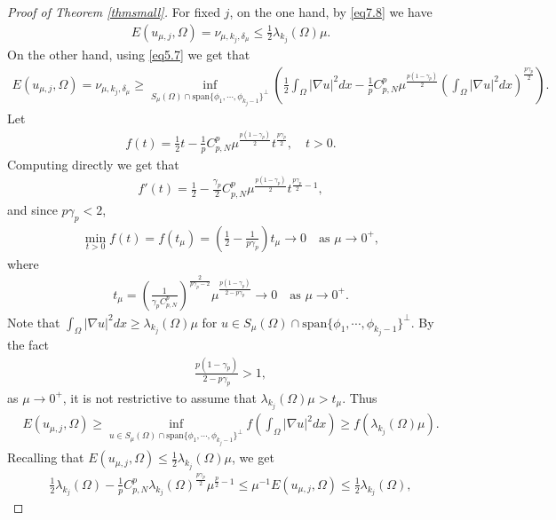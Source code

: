 \documentclass[10pt,a4paper]{article}
\theoremstyle{definition} \theoremstyle{remark}
\numberwithin{equation}{section}
\newcommand{\la}{\lambda}
\newcommand{\ga}{\gamma}
\begin{document}
\begin{proof}[Proof of Theorem \ref{thmsmall}]
For fixed $j$, on the one hand, by \eqref{eq7.8} we have
\begin{align*}
	E(u_{\mu,j},\Omega) = \nu_{\mu,k_j,\delta_\mu} \le \frac12\la_{k_j}(\Omega) \mu.
\end{align*}
On the other hand, using \eqref{eq5.7} we get that
\begin{align*}
	E(u_{\mu,j},\Omega) = \nu_{\mu,k_j,\delta_\mu} \geq \inf_{S_\mu(\Omega) \cap \text{span}\{\phi_1,\cdots,\phi_{k_j-1}\}^{\bot}}\left( \frac12 \int_\Omega |\nabla u|^2dx - \frac1p C_{p,N}^p \mu^{\frac{p(1-\ga_p)}{2}}\left( \int_\Omega |\nabla u|^2dx\right) ^{\frac{p\ga_p}{2}} \right).
\end{align*}
Let
\begin{align*}
	f(t) = \frac12 t - \frac1p C_{p,N}^p \mu^{\frac{p(1-\ga_p)}{2}}t ^{\frac{p\ga_p}{2}}, \quad t > 0.
\end{align*}
Computing directly we get that
\begin{align*}
	f'(t) = \frac12 - \frac{\ga_p}2 C_{p,N}^p \mu^{\frac{p(1-\ga_p)}{2}}t ^{\frac{p\ga_p}{2}-1},
\end{align*}
and since $p\ga_p < 2$,
\begin{align*}
	\min_{t > 0}f(t) = f(t_\mu) = \left( \frac12 - \frac{1}{p\ga_p}\right) t_\mu \to 0 \quad \text{as } \mu \to 0^+,
\end{align*}
where
\begin{align*}
	t_\mu = \left( \frac{1}{\ga_pC_{p,N}^p}\right) ^{\frac{2}{p\ga_p-2}}\mu^{\frac{p(1-\ga_p)}{2-p\ga_p}} \to 0 \quad \text{as } \mu \to 0^+.
\end{align*}
Note that $\int_\Omega |\nabla u|^2dx \geq \la_{k_j}(\Omega)\mu$ for $u \in S_\mu(\Omega) \cap \text{span}\{\phi_1,\cdots,\phi_{k_j-1}\}^{\bot}$. By the fact
\begin{align*}
	\frac{p(1-\ga_p)}{2-p\ga_p} > 1,
\end{align*}
as $\mu \to 0^+$, it is not restrictive to assume that $\la_{k_j}(\Omega)\mu > t_\mu$. Thus
\begin{align*}
	E(u_{\mu,j},\Omega) \geq \inf_{u \in S_\mu(\Omega) \cap \text{span}\{\phi_1,\cdots,\phi_{k_j-1}\}^{\bot}}f(\int_\Omega |\nabla u|^2dx) \ge f(\la_{k_j}(\Omega)\mu).
\end{align*}
Recalling that $E(u_{\mu,j},\Omega) \le \frac12\la_{k_j}(\Omega) \mu$, we get
\begin{align*}
	\frac12\la_{k_j}(\Omega) - \frac1p C_{p,N}^p \la_{k_j}(\Omega)^{\frac{p\ga_p}{2}} \mu^{\frac{p}{2}-1} \le \mu^{-1}E(u_{\mu,j},\Omega) \le \frac12\la_{k_j}(\Omega),
\end{align*}

\end{proof}
\end{document}
